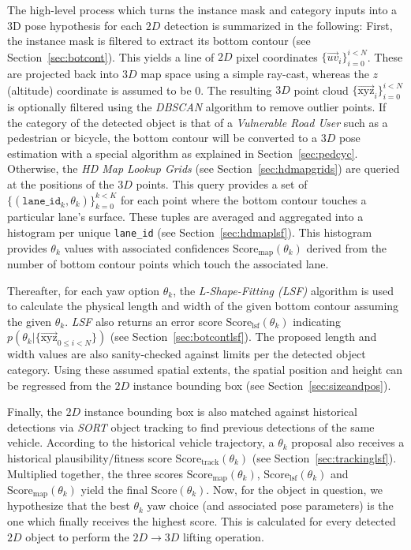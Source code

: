 The high-level process which turns the instance mask and category inputs into a 3D pose hypothesis for each $2D$ detection is summarized in the following:
First, the instance mask is filtered to extract its bottom contour (see Section~\ref{sec:botcont}).
This yields a line of $2D$ pixel coordinates $\{\overrightarrow{uv}_i\}_{i=0}^{i < N}$.
These are projected back into $3D$ map space using a simple ray-cast, whereas the $z$ (altitude) coordinate is assumed to be 0.
The resulting $3D$ point cloud $\{\overrightarrow{\text{xyz}}_i\}_{i=0}^{i < N}$ is optionally filtered using the \textit{DBSCAN} algorithm to remove outlier points.
If the category of the detected object is that of a \textit{Vulnerable Road User} such as a pedestrian or bicycle, the bottom contour will be converted to a $3D$ pose estimation with a special algorithm as explained in Section~\ref{sec:pedcyc}.
Otherwise, the \textit{HD Map Lookup Grids} (see Section~\ref{sec:hdmapgrids}) are queried at the positions of the $3D$ points.
This query provides a set of $\{(\mathtt{lane\_id}_k, \theta_k)\}_{k=0}^{k<K}$ for each point where the bottom contour touches a particular lane's surface.
These tuples are averaged and aggregated into a histogram per unique \texttt{lane\_id} (see Section~\ref{sec:hdmaplsf}).
This histogram provides $\theta_k$ values with associated confidences $\text{Score}_\text{map}(\theta_k)$ derived from the number of bottom contour points which touch the associated lane.

Thereafter, for each yaw option $\theta_k$, the \textit{L-Shape-Fitting (LSF)} algorithm is used to calculate the physical length and width of the given bottom contour assuming the given $\theta_k$. \textit{LSF} also returns an error score $\text{Score}_\text{lsf}(\theta_k)$ indicating $p(\theta_k|\{\overrightarrow{\text{xyz}}_{0 \leq i < N}\})$ (see Section~\ref{sec:botcontlsf}).
The proposed length and width values are also sanity-checked against limits per the detected object category.
Using these assumed spatial extents, the spatial position and height can be regressed from the $2D$ instance bounding box (see Section~\ref{sec:sizeandpos}).

Finally, the $2D$ instance bounding box is also matched against historical detections via \textit{SORT} object tracking to find previous detections of the same vehicle.
According to the historical vehicle trajectory, a $\theta_k$ proposal also receives a historical plausibility/fitness score $\text{Score}_\text{track}(\theta_k)$ (see Section~\ref{sec:trackinglsf}).
Multiplied together, the three scores $\text{Score}_\text{map}(\theta_k)$, $\text{Score}_\text{lsf}(\theta_k)$ and $\text{Score}_\text{map}(\theta_k)$ yield the final $\text{Score}(\theta_k)$.
Now, for the object in question, we hypothesize that the best $\theta_k$ yaw choice (and associated pose parameters) is the one which finally receives the highest score.
This is calculated for every detected $2D$ object to perform the $2D \rightarrow 3D$ lifting operation.

